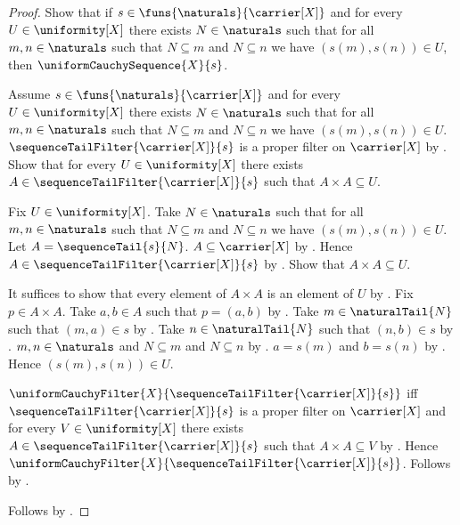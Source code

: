 \begin{proof}
    Show that if $s\in\funs{\naturals}{\carrier[X]}$ and for every
        $U\in\uniformity[X]$ there exists $N\in\naturals$ such that for all
        $m,n\in\naturals$ such that $N\subseteq m$ and $N\subseteq n$ we
        have $(s(m),s(n))\in U$, then $\uniformCauchySequence{X}{s}$.
    \begin{subproof}
        Assume $s\in\funs{\naturals}{\carrier[X]}$ and for every
            $U\in\uniformity[X]$ there exists $N\in\naturals$ such that for
            all $m,n\in\naturals$ such that $N\subseteq m$ and
            $N\subseteq n$ we have $(s(m),s(n))\in U$.
        $\sequenceTailFilter{\carrier[X]}{s}$ is a proper filter on
            $\carrier[X]$ by .
        Show that for every $U\in\uniformity[X]$ there exists
            $A\in\sequenceTailFilter{\carrier[X]}{s}$ such that
            $A\times A\subseteq U$.
        \begin{subproof}
            Fix $U\in\uniformity[X]$.
            Take $N\in\naturals$ such that for all
                $m,n\in\naturals$ such that $N\subseteq m$ and
                $N\subseteq n$ we have $(s(m),s(n))\in U$.
            Let $A=\sequenceTail{s}{N}$.
            $A\subseteq\carrier[X]$ by .
            Hence $A\in\sequenceTailFilter{\carrier[X]}{s}$
                by .
            Show that $A\times A\subseteq U$.
            \begin{subproof}
                It suffices to show that every element of $A\times A$ is
                    an element of $U$ by .
                Fix $p\in A\times A$.
                Take $a,b\in A$ such that $p=(a,b)$
                    by .
                Take $m\in\naturalTail{N}$ such that $(m,a)\in s$
                    by .
                Take $n\in\naturalTail{N}$ such that $(n,b)\in s$
                    by .
                $m,n\in\naturals$ and $N\subseteq m$ and $N\subseteq n$
                    by .
                $a=s(m)$ and $b=s(n)$
                    by .
                Hence $(s(m),s(n))\in U$.
            \end{subproof}
        \end{subproof}
        $\uniformCauchyFilter{X}
                {\sequenceTailFilter{\carrier[X]}{s}}$ iff
            $\sequenceTailFilter{\carrier[X]}{s}$ is a proper filter on
                $\carrier[X]$ and
            for every $V\in\uniformity[X]$ there exists
                $A\in\sequenceTailFilter{\carrier[X]}{s}$ such that
                $A\times A\subseteq V$ by
            .
        Hence $\uniformCauchyFilter{X}
            {\sequenceTailFilter{\carrier[X]}{s}}$.
        Follows by .
    \end{subproof}
    Follows by \auto.
\end{proof}

